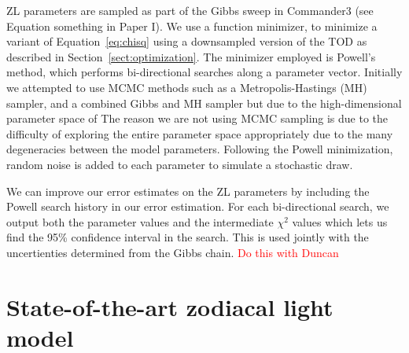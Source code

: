 \documentclass{aa}
\begin{document}
ZL parameters are sampled as part of the Gibbs sweep in Commander3 (see 
Equation something in Paper I). We use a function minimizer, to minimize 
a variant of Equation~\eqref{eq:chisq} using a downsampled version of the
TOD as described in Section~\ref{sect:optimization}. The minimizer employed
is Powell's method, which performs bi-directional searches along a parameter 
vector. Initially we attempted to use MCMC methods such as a 
Metropolis-Hastings (MH) sampler, and a combined Gibbs and MH sampler but
due to the high-dimensional parameter space of 
The reason we are not using MCMC 
sampling is due to the difficulty of exploring the entire parameter space 
appropriately due to the many degeneracies between the model parameters. 
Following the Powell minimization, random noise is added to each parameter
to simulate a stochastic draw. 

We can improve our error estimates on the ZL parameters by including the 
Powell search history in our error estimation. For each bi-directional 
search, we output both the parameter values and the intermediate $\chi^2$
values which lets us find the 95\% confidence interval in the search. This
is used jointly with the uncertienties determined from the Gibbs chain.
\textcolor{red}{Do this with Duncan}



\section{State-of-the-art zodiacal light model}\label{sect:improved-model}




\end{document}

